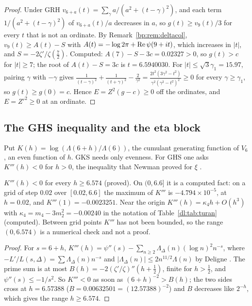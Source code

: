 \begin{proof}
Under GRH $v_{6+a}(t)=\sum_\gamma a/(a^2+(t-\gamma)^2)$, and each term $1/(a^2+(t-\gamma)^2)$ of $v_{6+a}(t)/a$ decreases in $a$, so $g(t)\ge v_9(t)/3$ for every $t$ that is not an ordinate. By Remark~\ref{bp:rem:deltacol}, $v_9(t)\ge A(t)-S$ with $A(t)=-\log2\pi+\operatorname{Re}\psi(9+it)$, which increases in $|t|$, and $S=-2\zeta'/\zeta(\frac72)$. Computed: $A(7)-S-3c=0.02327>0$, so $g(t)>c$ for $|t|\ge7$; the root of $A(t)-S=3c$ is $t=6.5940030$. For $|t|\le\sqrt3\gamma_1=15.97$, pairing $\gamma$ with $-\gamma$ gives $\frac1{(t-\gamma)^2}+\frac1{(t+\gamma)^2}-\frac2{\gamma^2}=\frac{2t^2(3\gamma^2-t^2)}{\gamma^2(\gamma^2-t^2)^2}\ge0$ for every $\gamma\ge\gamma_1$, so $g(t)\ge g(0)=c$. Hence $E=Z^2(g-c)\ge0$ off the ordinates, and $E=Z'^2\ge0$ at an ordinate.
\end{proof}

\subsection{The GHS inequality and the eta block}\label{dl:sec:ghs}

Put $K(h)=\log(\Lambda(6+h)/\Lambda(6))$, the cumulant generating function of $V_6$, an even function of $h$. GKS needs only evenness. For GHS one asks $K'''(h)<0$ for $h>0$, the inequality that Newman proved for $\xi$ \cite{Newman91}.

\begin{theorem}\label{dl:thm:ghs}
$K'''(h)<0$ for every $h\ge6.574$ (proved). On $(0,6.6]$ it is a computed fact: on a grid of step $0.02$ over $[0.02,6.6]$ the maximum of $K'''$ is $-4.794\times10^{-5}$, at $h=0.02$, and $K'''(1)=-0.0023251$. Near the origin $K'''(h)=\kappa_4h+O(h^3)$ with $\kappa_4=m_4-3m_2^2=-0.00240$ in the notation of Table~\ref{dl:tab:turan} (computed). Between grid points $K'''$ has not been bounded, so the range $(0,6.574)$ is a numerical check and not a proof.
\end{theorem}

\begin{proof}
For $s=6+h$, $K'''(h)=\psi''(s)-\sum_{n\ge2}\Lambda_\Delta(n)(\log n)^2n^{-s}$, where $-L'/L(s,\Delta)=\sum\Lambda_\Delta(n)n^{-s}$ and $|\Lambda_\Delta(n)|\le2n^{11/2}\Lambda(n)$ by Deligne \cite{Deligne74}. The prime sum is at most $B(h)=-2(\zeta'/\zeta)''(h+\frac12)$, finite for $h>\frac12$, and $\psi''(s)\le-1/s^2$. So $K'''<0$ as soon as $(6+h)^{-2}>B(h)$; the two sides cross at $h=6.57388$ ($B=0.00632501=(12.57388)^{-2}$) and $B$ decreases like $2^{-h}$, which gives the range $h\ge6.574$.
\end{proof}

